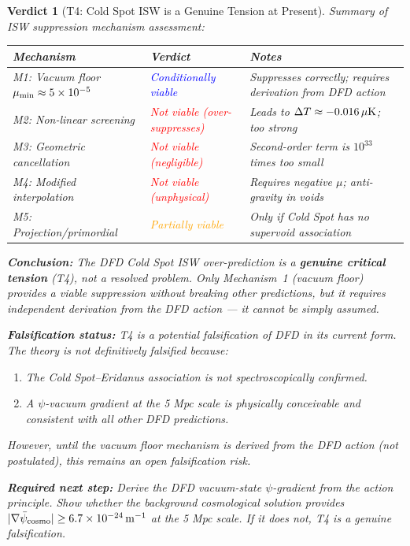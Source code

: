 \documentclass[11pt]{article}
\newtheorem{verdict}{Verdict}
\newcommand{\ee}[1]{\times 10^{#1}}
\newcommand{\mumin}{\mu_{\rm min}}
\newcommand{\deltaT}{\Delta T}
\newcommand{\psibar}{\bar{\psi}_{\rm cosmo}}
\begin{document}
\begin{verdict}[T4: Cold Spot ISW is a Genuine Tension at Present]\label{verdict:t4}
Summary of ISW suppression mechanism assessment:

\begin{center}
\begin{tabular}{p{4cm}p{3cm}p{6cm}}
\toprule
Mechanism & Verdict & Notes \\
\midrule
M1: Vacuum floor $\mumin \approx 5\ee{-5}$ &
\textcolor{blue}{Conditionally viable} &
Suppresses correctly; requires derivation from DFD action \\
M2: Non-linear screening &
\textcolor{red}{Not viable (over-suppresses)} &
Leads to $\deltaT \approx -0.016\,\mu{\rm K}$; too strong \\
M3: Geometric cancellation &
\textcolor{red}{Not viable (negligible)} &
Second-order term is $10^{33}$ times too small \\
M4: Modified interpolation &
\textcolor{red}{Not viable (unphysical)} &
Requires negative $\mu$; anti-gravity in voids \\
M5: Projection/primordial &
\textcolor{orange}{Partially viable} &
Only if Cold Spot has no supervoid association \\
\bottomrule
\end{tabular}
\end{center}

\textbf{Conclusion:} The DFD Cold Spot ISW over-prediction is a
\textbf{genuine critical tension} (T4), not a resolved problem.
Only Mechanism~1 (vacuum floor) provides a viable suppression without
breaking other predictions, but it requires independent derivation from
the DFD action --- it cannot be simply assumed.

\textbf{Falsification status:} T4 is a \textit{potential falsification}
of DFD in its current form.  The theory is not definitively falsified
because:
\begin{enumerate}[nosep]
  \item The Cold Spot--Eridanus association is not spectroscopically confirmed.
  \item A $\psi$-vacuum gradient at the 5 Mpc scale is physically conceivable
    and consistent with all other DFD predictions.
\end{enumerate}
However, until the vacuum floor mechanism is derived from the DFD action
(not postulated), this remains an \emph{open falsification risk}.

\textbf{Required next step:} Derive the DFD vacuum-state $\psi$-gradient
from the action principle. Show whether the background cosmological
solution provides $|\nabla\psibar| \geq 6.7\ee{-24}\,{\rm m}^{-1}$
at the 5 Mpc scale.  If it does not, T4 is a genuine falsification.
\end{verdict}
\end{document}

